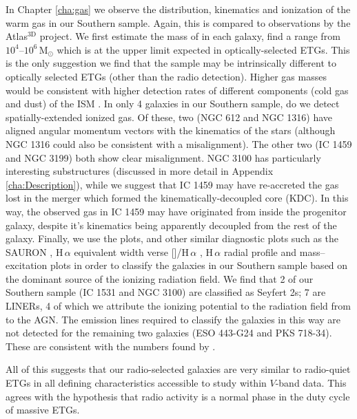 In Chapter \ref{cha:gas} we observe the distribution, kinematics and ionization of the warm gas in our Southern sample. Again, this is compared to observations by the Atlas$^\text{3D}$ project. We first estimate the mass of  in each galaxy, find a range from $10^4$--$10^6\,\mathrm{M_\odot}$ which is at the upper limit expected in optically-selected ETGs. This is the only suggestion we find that the sample may be intrinsically different to optically selected ETGs (other than the radio detection). Higher gas masses would be consistent with higher detection rates of different components (cold gas and dust) of the ISM \citep[e.g.][]{DeRuiter2002, Leon2003, VerdoesKleijn2005}. In only 4 galaxies in our Southern sample, do we detect spatially-extended ionized gas. Of these, two (NGC 612 and NGC 1316) have aligned angular momentum vectors with the kinematics of the stars (although NGC 1316 could also be consistent with a misalignment). The other two (IC 1459 and NGC 3199) both show clear misalignment. NGC 3100 has particularly interesting substructures (discussed in more detail in Appendix \ref{cha:Description}), while we suggest that IC 1459 may have re-accreted the gas lost in the merger which formed the kinematically-decoupled core (KDC). In this way, the observed gas in IC 1459 may have originated from inside the progenitor galaxy, despite it's kinematics being apparently decoupled from the rest of the galaxy. Finally, we use the \citet[; BPT]{Baldwin1981} plots, and other similar diagnostic plots such as the SAURON \citep{Sarzi2010}, H\,$\alpha$ equivalent width verse []/H\,$\alpha$ \citep[WHaN2;][]{CidFernandes2011}, H\,$\alpha$ radial profile and mass--excitation \citep[MEx;][]{Nyland2016} plots in order to classify the galaxies in our Southern sample based on the dominant source of the ionizing radiation field. We find that 2 of our Southern sample (IC 1531 and NGC 3100) are classified as Seyfert 2s; 7 are LINERs, 4 of which we attribute the ionizing potential to the radiation field from to the AGN. The emission lines required to classify the galaxies in this way are not detected for the remaining two galaxies (ESO 443-G24 and PKS 718-34). These are consistent with the numbers found by \citet{Nyland2016}.

All of this suggests that our radio-selected galaxies are very similar to radio-quiet ETGs in all defining characteristics accessible to study within $V$-band data. This agrees with the hypothesis that radio activity is a normal phase in the duty cycle of massive ETGs. 

